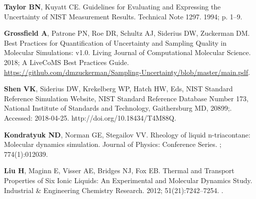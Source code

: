 \documentclass[9pt,bestpractices]{livecoms}
\providecommand{\DIFadd}[1]{{\protect\color{blue}\uwave{#1}}} %
\providecommand{\DIFaddbegin}{} %
\providecommand{\DIFaddend}{} %
\providecommand{\DIFdelbegin}{} %
\providecommand{\DIFdelend}{} %
\begin{document}
\begin{thebibliography}{59}
\textbf{\color{LiveCoMSMediumGrey} Taylor BN}, Kuyatt CE.
\newblock Guidelines for Evaluating and Expressing the Uncertainty of {NIST}
  Measurement Results.
 Technical Note 1297.  1994; p. 1--9.

\textbf{\color{LiveCoMSMediumGrey} Grossfield A}, Patrone PN, Roe DR, Schultz
  AJ, Siderius DW, Zuckerman DM.
\newblock Best Practices for Quantification of Uncertainty and Sampling Quality
  in Molecular Simulations: v1.0.
\newblock Living Journal of Computational Molecular Science.  2018; A LiveCoMS
  Best Practices Guide.
\newblock
  \urlprefix\url{https://github.com/dmzuckerman/Sampling-Uncertainty/blob/master/main.pdf}.

\textbf{\color{LiveCoMSMediumGrey} Shen VK}, Siderius DW, Krekelberg WP, Hatch
  HW, Eds, {NIST Standard Reference Simulation Website, NIST Standard Reference
  Database Number 173, National Institute of Standards and Technology,
  Gaithersburg MD, 20899};.
\newblock Accessed: 2018-04-25.
\newblock http://doi.org/10.18434/T4M88Q.

\DIFdelbegin %
\DIFdelend \DIFaddbegin {}
\DIFaddend \textbf{\color{LiveCoMSMediumGrey} Kondratyuk ND}, Norman GE, Stegailov VV.
\newblock Rheology of liquid n-triacontane: Molecular dynamics simulation.
\newblock Journal of Physics: Conference Series.  \DIFaddbegin \DIFadd{2016}\DIFaddend ; 774(1):012039.

\textbf{\color{LiveCoMSMediumGrey} Liu H}, Maginn E, Visser AE, Bridges NJ, Fox
  EB.
\newblock Thermal and Transport Properties of Six Ionic Liquids: An
  Experimental and Molecular Dynamics Study.
\newblock Industrial \& Engineering Chemistry Research.  2012;
  51(21):7242--7254.
\newblock \href{https://dx.doi.org/10.1021/ie300222a}{\doiprefix
  }.


\end{thebibliography}
\end{document}
